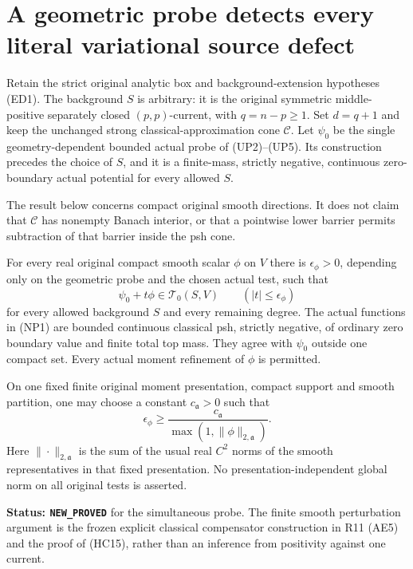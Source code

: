 \section{A geometric probe detects every literal variational source defect}
\label{sec:r12-single-probe-normal-residual}

Retain the strict original analytic box and background-extension
hypotheses \textup{(ED1)}.  The background $S$ is arbitrary:
it is the original symmetric middle-positive separately closed
$(p,p)$-current, with $q=n-p\ge1$.  Set $d=q+1$ and keep
the unchanged strong classical-approximation cone $\mathscr C$.
Let $\psi_0$ be the single geometry-dependent bounded actual
probe of \textup{(UP2)--(UP5)}.  Its construction precedes
the choice of $S$, and it is a finite-mass, strictly negative,
continuous zero-boundary actual potential for every allowed $S$.

The result below concerns compact original smooth directions.
It does not claim that $\mathscr C$ has nonempty Banach
interior, or that a pointwise lower barrier permits subtraction
of that barrier inside the psh cone.

\begin{lemma}
\label{lem:r12-two-sided-geometric-probe}
For every real original compact smooth scalar $\phi$ on $V$
there is $\epsilon_\phi>0$, depending only on the geometric
probe and the chosen actual test, such that
\[
             \psi_0+t\phi\in\mathscr T_0(S,V)
                  \qquad(|t|\le\epsilon_\phi)
 \tag{NP1}
\]
for every allowed background $S$ and every remaining degree.
The actual functions in \textup{(NP1)} are bounded continuous
classical psh, strictly negative, of ordinary zero boundary
value and finite total top mass.  They agree with $\psi_0$
outside one compact set.  Every actual moment refinement of
$\phi$ is permitted.

On one fixed finite original moment presentation, compact
support and smooth partition, one may choose a constant
$c_{\mathfrak a}>0$ such that
\[
       \epsilon_\phi\ge
           \frac{c_{\mathfrak a}}{\max(1,\|\phi\|_{2,\mathfrak a})}.
 \tag{NP2}
\]
Here $\|\cdot\|_{2,\mathfrak a}$ is the sum of the
usual real $C^2$ norms of the smooth representatives in
that fixed presentation.  No presentation-independent
global norm on all original tests is asserted.
\end{lemma}

\noindent\textbf{Status: \texttt{NEW\_PROVED}} for the
simultaneous probe.  The finite smooth perturbation argument
is the frozen explicit classical compensator construction in
R11 \textup{(AE5)} and the proof of \textup{(HC15)}, rather
than an inference from positivity against one current.

